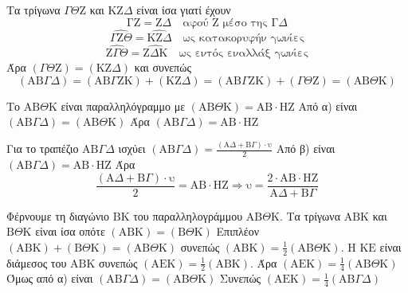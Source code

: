 \begin{alist}
    \item Τα τρίγωνα $\Gamma\Theta\text{Z}$ και $\text{KZ}\Delta$ είναι ίσα γιατί έχουν
    \[
    \text{ΓZ} = \text{Z}\Delta \quad \text{αφού Z μέσο της } \text{Γ}\Delta
    \]
    \[
    \widehat{\Gamma\text{Z}\Theta} = \widehat{\text{KZ}\Delta} \quad \text{ως κατακορυφήν γωνίες}
    \]
    \[
    \widehat{\text{Z}\Gamma\Theta} = \widehat{\text{Z}\Delta\text{K}} \quad \text{ως εντός εναλλάξ γωνίες}
    \]
    Άρα $(\Gamma\Theta\text{Z}) = (\text{KZ}\Delta)$ και συνεπώς
    \[
    (\text{AB}\Gamma\Delta) = (\text{AB}\Gamma\text{ZK}) + (\text{KZ}\Delta) = (\text{AB}\Gamma\text{ZK}) + (\Gamma\Theta\text{Z}) = (\text{AB}\Theta\text{K})
    \]

    \item Το $\text{AB}\Theta\text{K}$ είναι παραλληλόγραμμο με $(\text{AB}\Theta\text{K}) = \text{AB} \cdot \text{HZ}$
    Από α) είναι $(\text{AB}\Gamma\Delta) = (\text{AB}\Theta\text{K})$
    Άρα $(\text{AB}\Gamma\Delta) = \text{AB} \cdot \text{HZ}$

    \item Για το τραπέζιο $\text{AB}\Gamma\Delta$ ισχύει $(\text{AB}\Gamma\Delta) = \frac{(\text{A}\Delta+\text{B}\Gamma)\cdot \text{υ}}{2}$
    Από β) είναι $(\text{AB}\Gamma\Delta) = \text{AB} \cdot \text{HZ}$
    Άρα
    \[
    \frac{(\text{A}\Delta+\text{B}\Gamma)\cdot \text{υ}}{2} = \text{AB} \cdot \text{HZ} \Rightarrow \text{υ} = \frac{2 \cdot \text{AB} \cdot \text{HZ}}{\text{A}\Delta+\text{B}\Gamma}
    \]

    \item Φέρνουμε τη διαγώνιο $\text{BK}$ του παραλληλογράμμου $\text{AB}\Theta\text{K}$.
    Τα τρίγωνα $\text{ABK}$ και $\text{B}\Theta\text{K}$ είναι ίσα οπότε $(\text{ABK})=(\text{B}\Theta\text{K})$
    Επιπλέον $(\text{ABK})+(\text{B}\Theta\text{K}) = (\text{AB}\Theta\text{K})$ συνεπώς $(\text{ABK}) = \frac{1}{2}(\text{AB}\Theta\text{K}) .$
    Η $\text{KE}$ είναι διάμεσος του $\text{ABK}$ συνεπώς $(\text{AEK}) = \frac{1}{2}(\text{ABK}) .$
    Άρα $(\text{AEK}) = \frac{1}{4}(\text{AB}\Theta\text{K})$
    Όμως από α) είναι $(\text{AB}\Gamma\Delta) = (\text{AB}\Theta\text{K})$
    Συνεπώς $(\text{AEK}) = \frac{1}{4}(\text{AB}\Gamma\Delta)$
\end{alist}